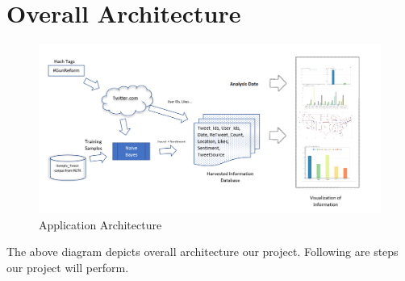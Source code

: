 \documentclass[journal, a4paper]{IEEEtran}
\begin{document}
\section{Overall Architecture}
    \begin{figure}[!hbt]
		\begin{center}
		\includegraphics[width=\columnwidth]{Overall_Arch}
%
		\caption{Application Architecture}
		\label{fig:tf_plot}
		\end{center}
	\end{figure}
The above diagram depicts overall architecture our project. Following are steps our project will perform.
\end{document}
